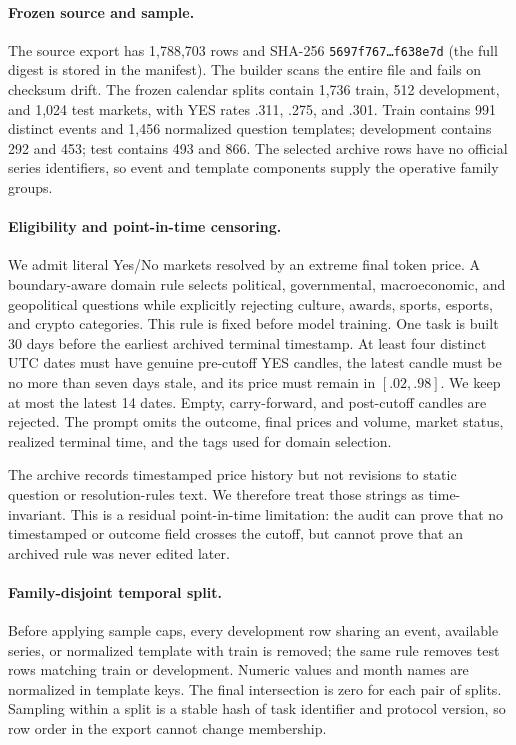 \paragraph{Frozen source and sample.}
The source export has 1,788,703 rows and SHA-256
\texttt{5697f767\ldots f638e7d} (the full digest is stored in the manifest).
The builder scans the entire file and fails on checksum drift. The frozen calendar
splits contain 1,736 train, 512 development, and 1,024 test markets, with YES rates
.311, .275, and .301. Train contains 991 distinct events and 1,456 normalized
question templates; development contains 292 and 453; test contains 493 and 866.
The selected archive rows have no official series identifiers, so event and
template components supply the operative family groups.

\paragraph{Eligibility and point-in-time censoring.}
We admit literal Yes/No markets resolved by an extreme final token price. A
boundary-aware domain rule selects political, governmental, macroeconomic, and
geopolitical questions while explicitly rejecting culture, awards, sports,
esports, and crypto categories. This rule is fixed before model training. One task
is built 30 days before the earliest archived terminal timestamp. At least four
distinct UTC dates must have genuine pre-cutoff YES candles, the latest candle must
be no more than seven days stale, and its price must remain in $[.02,.98]$. We keep
at most the latest 14 dates. Empty, carry-forward, and post-cutoff candles are
rejected. The prompt omits the outcome, final prices and volume, market status,
realized terminal time, and the tags used for domain selection.

The archive records timestamped price history but not revisions to static question
or resolution-rules text. We therefore treat those strings as time-invariant. This
is a residual point-in-time limitation: the audit can prove that no timestamped or
outcome field crosses the cutoff, but cannot prove that an archived rule was never
edited later.

\paragraph{Family-disjoint temporal split.}
Before applying sample caps, every development row sharing an event, available
series, or normalized template with train is removed; the same rule removes test
rows matching train or development. Numeric values and month names are normalized
in template keys. The final intersection is zero for each pair of splits. Sampling
within a split is a stable hash of task identifier and protocol version, so row
order in the export cannot change membership.

